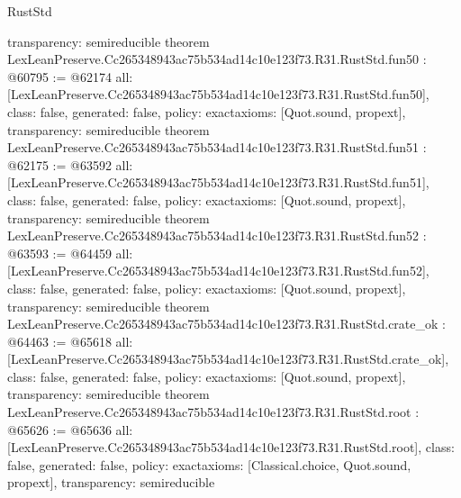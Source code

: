 \begin{lexlean}{RustStd}
\begin{coremodule}
{  transparency: semireducible
}
theorem LexLeanPreserve.Cc265348943ac75b534ad14c10e123f73.R31.RustStd.fun50 : @60795 := @62174 {
  all: [LexLeanPreserve.Cc265348943ac75b534ad14c10e123f73.R31.RustStd.fun50],
  class: false,
  generated: false,
  policy: exact{axioms: [Quot.sound, propext]},
  transparency: semireducible
}
theorem LexLeanPreserve.Cc265348943ac75b534ad14c10e123f73.R31.RustStd.fun51 : @62175 := @63592 {
  all: [LexLeanPreserve.Cc265348943ac75b534ad14c10e123f73.R31.RustStd.fun51],
  class: false,
  generated: false,
  policy: exact{axioms: [Quot.sound, propext]},
  transparency: semireducible
}
theorem LexLeanPreserve.Cc265348943ac75b534ad14c10e123f73.R31.RustStd.fun52 : @63593 := @64459 {
  all: [LexLeanPreserve.Cc265348943ac75b534ad14c10e123f73.R31.RustStd.fun52],
  class: false,
  generated: false,
  policy: exact{axioms: [Quot.sound, propext]},
  transparency: semireducible
}
theorem LexLeanPreserve.Cc265348943ac75b534ad14c10e123f73.R31.RustStd.crate_ok : @64463 := @65618 {
  all: [LexLeanPreserve.Cc265348943ac75b534ad14c10e123f73.R31.RustStd.crate_ok],
  class: false,
  generated: false,
  policy: exact{axioms: [Quot.sound, propext]},
  transparency: semireducible
}
theorem LexLeanPreserve.Cc265348943ac75b534ad14c10e123f73.R31.RustStd.root : @65626 := @65636 {
  all: [LexLeanPreserve.Cc265348943ac75b534ad14c10e123f73.R31.RustStd.root],
  class: false,
  generated: false,
  policy: exact{axioms: [Classical.choice, Quot.sound, propext]},
  transparency: semireducible
}


\end{coremodule}
\end{lexlean}
